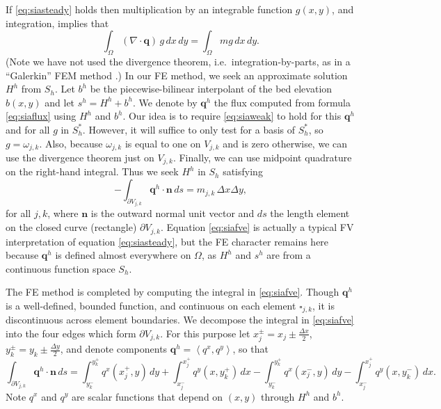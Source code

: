\documentclass[11pt]{amsart}
\newcommand\bn{\mathbf{n}}
\newcommand\bq{\mathbf{q}}
\newcommand{\Div}{\nabla\cdot}
\newcommand{\ip}[2]{\ensuremath{\left<#1,#2\right>}}
\newcommand{\dxtwo}{\tfrac{\Delta x}{2}}
\newcommand{\dytwo}{\tfrac{\Delta y}{2}}
\begin{document}
If \eqref{eq:siasteady} holds then multiplication by an integrable function $g(x,y)$, and integration, implies that
\begin{equation}
  \int_\Omega (\Div \bq)\, g\,dx\,dy = \int_\Omega m g\,dx\,dy.  \label{eq:siaweak}
\end{equation}
(Note we have not used the divergence theorem, i.e.~integration-by-parts, as in a ``Galerkin'' FEM method \cite{Elmanetal2005}.)  In our FE method, we seek an approximate solution $H^h$ from $S_h$.  Let $b^h$ be the piecewise-bilinear interpolant of the bed elevation $b(x,y)$ and let $s^h=H^h+b^h$.  We denote by $\bq^h$ the flux computed from formula \eqref{eq:siaflux} using $H^h$ and $b^h$.  Our idea is to require \eqref{eq:siaweak} to hold for this $\bq^h$ and for all $g$ in $S_h^*$.  However, it will suffice to only test for a basis of $S_h^*$, so $g=\omega_{j,k}$.  Also, because $\omega_{j,k}$ is equal to one on $V_{j,k}$ and is zero otherwise, we can use the divergence theorem just on $V_{j,k}$.  Finally, we can use midpoint quadrature on the right-hand integral.  Thus we seek $H^h$ in $S_h$ satisfying
\begin{equation}
  - \int_{\partial V_{j,k}} \bq^h \cdot \bn\,ds = m_{j,k}\, \Delta x \Delta y, \label{eq:siafve}
\end{equation}
for all $j,k$, where $\bn$ is the outward normal unit vector and $ds$ the length element on the closed curve (rectangle) $\partial V_{j,k}$.  Equation \eqref{eq:siafve} is actually a typical FV interpretation of equation \eqref{eq:siasteady}, but the FE character remains here because $\bq^h$ is defined almost everywhere on $\Omega$, as $H^h$ and $s^h$ are from a continuous function space $S_h$.

The FE method is completed by computing the integral in \eqref{eq:siafve}.  Though $\bq^h$ is a well-defined, bounded function, and continuous on each element $\square_{j,k}$, it is discontinuous across element boundaries.  We decompose the integral in \eqref{eq:siafve} into the four edges which form $\partial V_{j,k}$.  For this purpose let $x_j^\pm = x_j \pm \dxtwo$, $y_k^\pm = y_k \pm \dytwo$, and denote components $\bq^h = \ip{q^x}{q^y}$, so that
\begin{equation}
  \int_{\partial V_{j,k}} \bq^h \cdot \bn\,ds = \int_{y_k^-}^{y_k^+} q^x(x_j^+,y)\,dy + \int_{x_j^-}^{x_j^+} q^y(x,y_k^+)\,dx - \int_{y_k^-}^{y_k^+} q^x(x_j^-,y)\,dy - \int_{x_j^-}^{x_j^+} q^y(x,y_k^-)\,dx. \label{eq:fluxintdecomp}
\end{equation}
Note $q^x$ and $q^y$ are scalar functions that depend on $(x,y)$ through $H^h$ and $b^h$.
\end{document}
